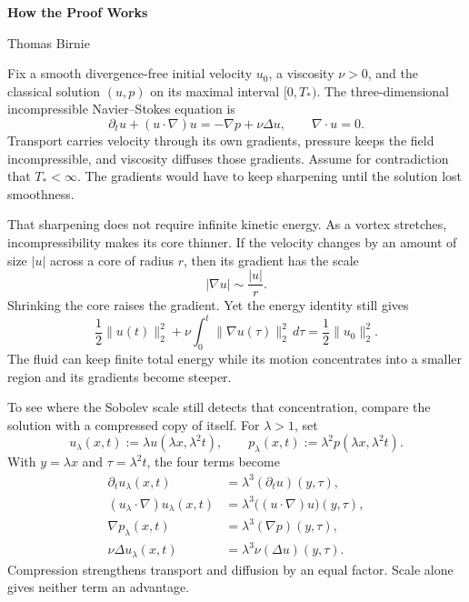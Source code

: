 \documentclass[11pt]{article}
\begin{document}
\begin{center}
  {\LARGE\bfseries How the Proof Works}\par
  \vspace{0.35\baselineskip}
  {\normalsize Thomas Birnie}\par
\end{center}

\vspace{0.55\baselineskip}

Fix a smooth divergence-free initial velocity \(u_0\), a viscosity \(\nu>0\),
and the classical solution \((u,p)\) on its maximal interval \([0,T_*)\).
The three-dimensional incompressible Navier--Stokes equation is
\[
  \partial_tu+(u\cdot\nabla)u
  =-\nabla p+\nu\Delta u,
  \qquad
  \nabla\cdot u=0.
\]
Transport carries velocity through its own gradients, pressure keeps the field
incompressible, and viscosity diffuses those gradients. Assume for contradiction
that \(T_*<\infty\). The gradients would have to keep sharpening until the
solution lost smoothness.

That sharpening does not require infinite kinetic energy. As a vortex stretches,
incompressibility makes its core thinner. If the velocity changes by an amount
of size \(|u|\) across a core of radius \(r\), then its gradient has the scale
\[
  |\nabla u|\sim\frac{|u|}{r}.
\]
Shrinking the core raises the gradient. Yet the energy identity still gives
\[
  \frac12\|u(t)\|_2^2
  +\nu\int_0^t\|\nabla u(\tau)\|_2^2\,d\tau
  =\frac12\|u_0\|_2^2.
\]
The fluid can keep finite total energy while its motion concentrates into a
smaller region and its gradients become steeper.

To see where the Sobolev scale still detects that concentration, compare the
solution with a compressed copy of itself. For \(\lambda>1\), set
\[
  u_\lambda(x,t):=\lambda u(\lambda x,\lambda^2t),
  \qquad
  p_\lambda(x,t):=\lambda^2p(\lambda x,\lambda^2t).
\]
With \(y=\lambda x\) and \(\tau=\lambda^2t\), the four terms become
\[
\begin{aligned}
  \partial_tu_\lambda(x,t)
  &=\lambda^3(\partial_tu)(y,\tau),
  \\
  (u_\lambda\cdot\nabla)u_\lambda(x,t)
  &=\lambda^3\bigl((u\cdot\nabla)u\bigr)(y,\tau),
  \\
  \nabla p_\lambda(x,t)
  &=\lambda^3(\nabla p)(y,\tau),
  \\
  \nu\Delta u_\lambda(x,t)
  &=\lambda^3\nu(\Delta u)(y,\tau).
\end{aligned}
\]
Compression strengthens transport and diffusion by an equal factor. Scale
alone gives neither term an advantage.
\end{document}
